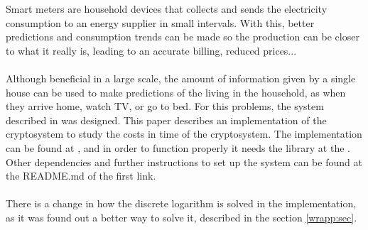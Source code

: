 
   Smart meters are household devices that collects and sends the electricity
   consumption to an energy supplier in small intervals. With this, better
   predictions and consumption trends can be made so the production can be closer to what it really is, leading to an accurate billing, reduced prices...\\
   \\
   Although beneficial in a large scale, the amount of information given by a single house can be used to make predictions of the living in the household, as when they arrive home, watch TV, or go to bed. For this problems, the system described in \cite{recsi}
   was designed. This paper describes an implementation of the cryptosystem to study the costs in time of the cryptosystem. The implementation can be found at \cite{smart}%
   , and in order to function properly it needs the library at the \cite{ciglib}
   . Other dependencies and further instructions to set up the system can be found at the README.md of the first link.
   \\\\
   There is a change in how the discrete logarithm is solved in the implementation, as it was found out a better way to solve it, described in
   the section \ref{wrapp:sec}.
   

